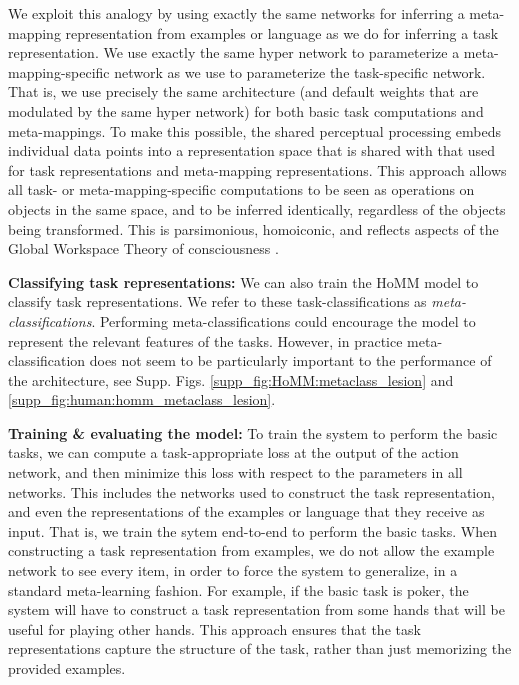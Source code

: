 We exploit this analogy by using exactly the same networks for inferring a meta-mapping representation from examples or language as we do for inferring a task representation. We use exactly the same hyper network to parameterize a meta-mapping-specific network as we use to parameterize the task-specific network. That is, we use precisely the same architecture (and default weights that are modulated by the same hyper network) for both basic task computations and meta-mappings. To make this possible, the shared perceptual processing embeds individual data points into a representation space that is shared with that used for task representations and meta-mapping representations. This approach allows all task- or meta-mapping-specific computations to be seen as operations on objects in the same space, and to be inferred identically, regardless of the objects being transformed. This is parsimonious, homoiconic, and reflects aspects of the Global Workspace Theory of consciousness \citep{Baars2005}.   

\textbf{Classifying task representations:} We can also train the HoMM model to classify task representations. We refer to these task-classifications as \emph{meta-classifications}. Performing meta-classifications could encourage the model to represent the relevant features of the tasks. However, in practice meta-classification does not seem to be particularly important to the performance of the architecture, see Supp. Figs. \ref{supp_fig:HoMM:metaclass_lesion} and \ref{supp_fig:human:homm_metaclass_lesion}.


\textbf{Training \& evaluating the model:} To train the system to perform the basic tasks, we can compute a task-appropriate loss at the output of the action network, and then minimize this loss with respect to the parameters in all networks. This includes the networks used to construct the task representation, and even the representations of the examples or language that they receive as input. That is, we train the sytem end-to-end to perform the basic tasks. When constructing a task representation from examples, we do not allow the example network to see every item, in order to force the system to generalize, in a standard meta-learning fashion. For example, if the basic task is poker, the system will have to construct a task representation from some hands that will be useful for playing other hands. This approach ensures that the task representations capture the structure of the task, rather than just memorizing the provided examples. 


